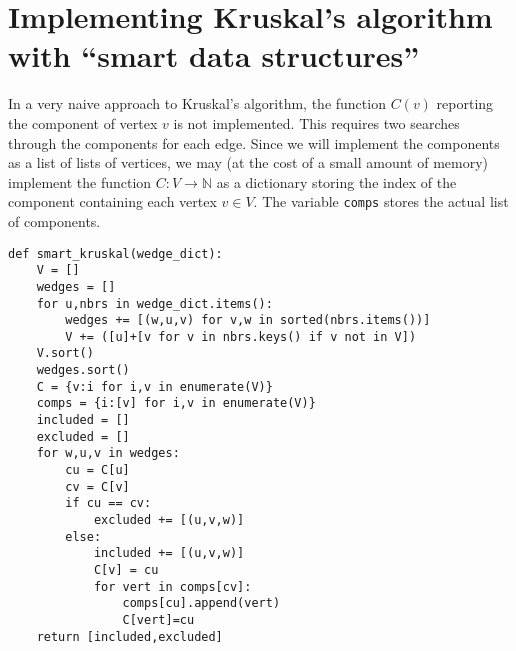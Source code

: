 \documentclass[m3380-lec-main.tex]{subfiles}
\begin{document}
\section[Implementing Kruskal's algorithm]{Implementing Kruskal's algorithm with ``smart data structures''}

In a very naive approach to Kruskal's algorithm, the function $C(v)$ reporting the component of vertex $v$ is not implemented. This requires two searches through the components for each edge. Since we will implement the components as a list of lists of vertices, we may (at the cost of a small amount of memory) implement the function $C:V\to \mathbb{N}$ as a dictionary storing the index of the component containing each vertex $v\in V$. The variable \verb|comps| stores the actual list of components.

\bc
\begin{verbatim}
def smart_kruskal(wedge_dict):
    V = []
    wedges = []
    for u,nbrs in wedge_dict.items():
        wedges += [(w,u,v) for v,w in sorted(nbrs.items())]
        V += ([u]+[v for v in nbrs.keys() if v not in V])
    V.sort()
    wedges.sort()
    C = {v:i for i,v in enumerate(V)}
    comps = {i:[v] for i,v in enumerate(V)}
    included = []
    excluded = []
    for w,u,v in wedges:
        cu = C[u]
        cv = C[v]
        if cu == cv:
            excluded += [(u,v,w)]
        else:
            included += [(u,v,w)]
            C[v] = cu
            for vert in comps[cv]:
                comps[cu].append(vert)
                C[vert]=cu
    return [included,excluded]
\end{verbatim}
\ec
\end{document}
